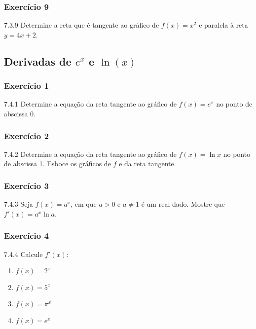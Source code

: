 \subsubsection*{Exercício 9}
\begin{exercicio}[9]{7.3.9}
Determine a reta que é tangente ao gráfico de $f(x) = x^2$ e paralela à reta $y = 4x + 2$.
\end{exercicio}

\clearpage

\subsection{Derivadas de $e^x$ e $\ln(x)$}

\subsubsection*{Exercício 1}
\begin{exercicio}[1]{7.4.1}
Determine a equação da reta tangente ao gráfico de $f(x) = e^x$ no ponto de abscissa 0.
\end{exercicio}

\subsubsection*{Exercício 2}
\begin{exercicio}[2]{7.4.2}
Determine a equação da reta tangente ao gráfico de $f(x) = \ln x$ no ponto de abscissa 1. Esboce os gráficos de $f$ e da reta tangente.
\end{exercicio}

\subsubsection*{Exercício 3}
\begin{exercicio}[3]{7.4.3}
Seja $f(x) = a^x$, em que $a > 0$ e $a \neq 1$ é um real dado. Mostre que $f'(x) = a^x \ln a$.
\end{exercicio}

\subsubsection*{Exercício 4}
\begin{exercicio}[4]{7.4.4}
Calcule $f'(x)$:
\begin{enumerate}[label=\alph*)]
    \item $f(x) = 2^x$
    \item $f(x) = 5^x$
    \item $f(x) = \pi^x$
    \item $f(x) = e^x$
\end{enumerate}
\end{exercicio}

